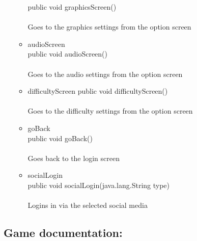 \documentclass[letterpaper]{article}
\begin{document}
\begin{itemize}
\begin{itemize}
												public void graphicsScreen() \\ \\
												Goes to the graphics settings from the option screen
										\item	audioScreen \\
												public void audioScreen() \\ \\
												Goes to the audio settings from the option screen
										\item	difficultyScreen
												public void difficultyScreen() \\ \\
												Goes to the difficulty settings from the option screen
										\item	goBack \\
												public void goBack() \\ \\
												Goes back to the login screen
										\item	socialLogin \\
												public void socialLogin(java.lang.String type) \\ \\
												Logins in via the selected social media
									\end{itemize}
						\end{itemize}
						
					\vspace{0.2in}
					\subsection*{Game documentation:}
					\vspace{0.1in}
					
\end{document}
